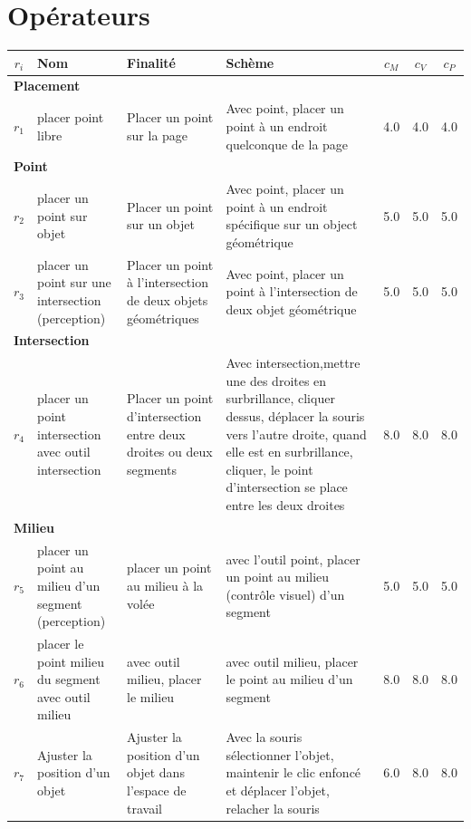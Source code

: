 \section*{Opérateurs}
\begin{longtable}{|c|p{3cm}|p{4cm}|p{4cm}|c|c|c|}
\hline
$r_i$ & Nom & Finalité & Schème & $c_M$ & $c_V$ & $c_P$ \\ \hline
\multicolumn{7}{|l|}{\textbf{Placement}} \\ \hline
$r_{1}$\label{op_pt_libre} & placer point libre & Placer un point sur la page & Avec point, placer un point à un endroit quelconque de la page & 4.0 & 4.0 & 4.0 \\ \hline
\multicolumn{7}{|l|}{\textbf{Point}} \\ \hline
$r_{2}$\label{op_pt_obj} & placer un point sur objet & Placer un point sur un objet & Avec point, placer un point à un endroit spécifique sur un object géométrique & 5.0 & 5.0 & 5.0 \\ \hline
$r_{3}$\label{op_pt_inter} & placer un point sur une intersection (perception) & Placer un point à l’intersection de deux objets géométriques & Avec point, placer un point à l'intersection de deux objet géométrique & 5.0 & 5.0 & 5.0 \\ \hline
\multicolumn{7}{|l|}{\textbf{Intersection}} \\ \hline
$r_{4}$\label{op_pt_inter_out_inter} & placer un point intersection avec outil intersection & Placer un point d'intersection entre deux droites ou deux segments & Avec intersection,mettre une des droites en surbrillance, cliquer dessus, déplacer la souris vers l'autre droite, quand elle est en surbrillance, cliquer, le point d'intersection se place entre les deux droites & 8.0 & 8.0 & 8.0 \\ \hline
\multicolumn{7}{|l|}{\textbf{Milieu}} \\ \hline
$r_{5}$\label{op_pt_milieu_perc} & placer un point au milieu d’un segment (perception) & placer un point au milieu à la volée & avec l'outil point, placer un point au milieu (contrôle visuel) d'un segment & 5.0 & 5.0 & 5.0 \\ \hline
$r_{6}$\label{op_pt_milieu_out_milieu} & placer le point milieu du segment avec outil milieu & avec outil milieu, placer le milieu & avec outil milieu, placer le point au milieu d'un segment & 8.0 & 8.0 & 8.0 \\ \hline
$r_{7}$\label{op_ajust_obj} & Ajuster la position d'un objet & Ajuster la position d'un objet dans l'espace de travail & Avec la souris sélectionner l'objet, maintenir le clic enfoncé et déplacer l'objet, relacher la souris & 6.0 & 8.0 & 8.0 \\ \hline

\end{longtable}

